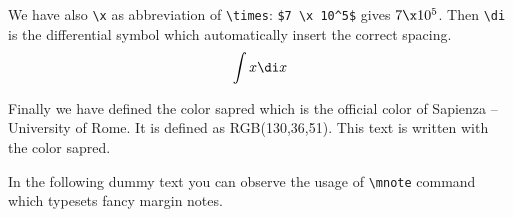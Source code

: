 \documentclass[LaM,binding=0.6cm]{sapthesis}
\newcommand{\bs}{\textbackslash}
\begin{document}
We have also \texttt{\bs x} as abbreviation of \texttt{\bs times}: \texttt{\$7 \bs x 10\^{}5\$} gives $7 \x 10^5$. Then \texttt{\bs di} is the differential symbol which automatically insert the correct spacing.
\[
\int x \di x
\]

Finally we have defined the color \textsf{sapred} which is the official color
of Sapienza -- University of Rome. It is defined as RGB(130,36,51). \textcolor{sapred}{This text is written with the color \textsf{sapred}.}

In the following dummy text you can observe the usage of \texttt{\bs mnote} command which typesets fancy margin notes.

\textcolor{gray}{\lipsum}
\textcolor{gray}{\lipsum}

\backmatter
\end{document}
